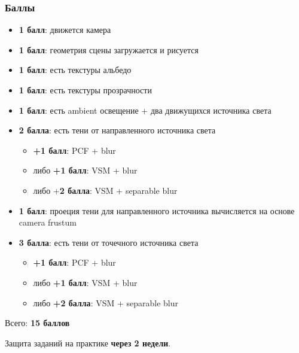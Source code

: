 \documentclass[10pt]{beamer}
\begin{document}
\begin{frame}[fragile]
\frametitle{Баллы}
\footnotesize
\begin{itemize}
\item \textbf{1 балл}: движется камера
\item \textbf{1 балл}: геометрия сцены загружается и рисуется
\item \textbf{1 балл}: есть текстуры альбедо
\item \textbf{1 балл}: есть текстуры прозрачности
\item \textbf{1 балл}: есть ambient освещение + два движущихся источника света
\item \textbf{2 балла}: есть тени от направленного источника света
\begin{itemize}
\item \textbf{+1 балл}: PCF + blur
\item либо \textbf{+1 балл}: VSM + blur
\item либо +\textbf{2 балла}: VSM + separable blur
\end{itemize}
\item \textbf{1 балл}: проеция тени для направленного источника вычисляется на основе camera frustum
\item \textbf{3 балла}: есть тени от точечного источника света
\begin{itemize}
\item \textbf{+1 балл}: PCF + blur
\item либо \textbf{+1 балл}: VSM + blur
\item либо \textbf{+2 балла}: VSM + separable blur
\end{itemize}
\end{itemize}
Всего: \textbf{15 баллов}

Защита заданий на практике \textbf{через 2 недели}.
\end{frame}
\end{document}
